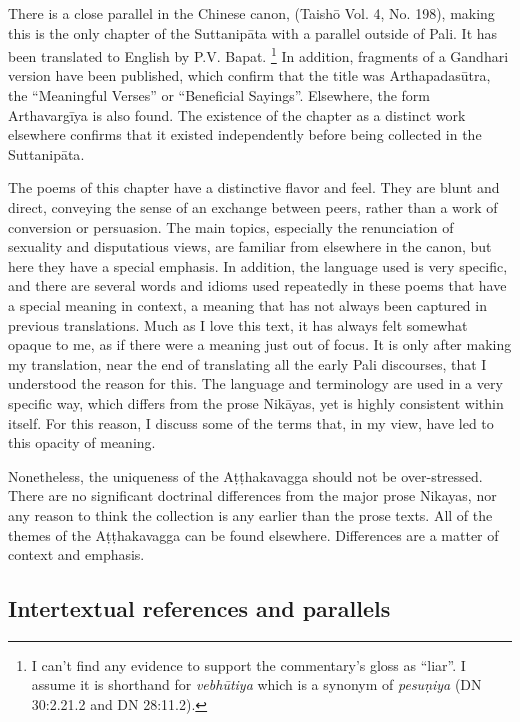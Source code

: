 \documentclass[12pt,openany]{book}%
\newcommand*{\langlzh}[1]{\cjk{#1}\normalfont}%
\begin{document}
There is a close parallel in the Chinese canon, \langlzh{義足經} (Taishō Vol. 4, No. 198), making this is the only chapter of the \textsanskrit{Suttanipāta} with a parallel outside of Pali. It has been translated to English by P.V. Bapat. \footnote{I can’t find any evidence to support the commentary’s gloss as “liar”. I assume it is shorthand for \textit{\textsanskrit{vebhūtiya}} which is a synonym of \textit{\textsanskrit{pesuṇiya}} (DN 30:2.21.2 and DN 28:11.2). } In addition, fragments of a Gandhari version have been published, which confirm that the title was \textsanskrit{Arthapadasūtra}, the “Meaningful Verses” or “Beneficial Sayings”. Elsewhere, the form \textsanskrit{Arthavargīya} is also found. The existence of the chapter as a distinct work elsewhere confirms that it existed independently before being collected in the \textsanskrit{Suttanipāta}.

The poems of this chapter have a distinctive flavor and feel. They are blunt and direct, conveying the sense of an exchange between peers, rather than a work of conversion or persuasion. The main topics, especially the renunciation of sexuality and disputatious views, are familiar from elsewhere in the canon, but here they have a special emphasis. In addition, the language used is very specific, and there are several words and idioms used repeatedly in these poems that have a special meaning in context, a meaning that has not always been captured in previous translations. Much as I love this text, it has always felt somewhat opaque to me, as if there were a meaning just out of focus. It is only after making my translation, near the end of translating all the early Pali discourses, that I understood the reason for this. The language and terminology are used in a very specific way, which differs from the prose \textsanskrit{Nikāyas}, yet is highly consistent within itself. For this reason, I discuss some of the terms that, in my view, have led to this opacity of meaning.

Nonetheless, the uniqueness of the \textsanskrit{Aṭṭhakavagga} should not be over-stressed. There are no significant doctrinal differences from the major prose Nikayas, nor any reason to think the collection is any earlier than the prose texts. All of the themes of the \textsanskrit{Aṭṭhakavagga} can be found elsewhere. Differences are a matter of context and emphasis.

\subsection*{Intertextual references and parallels}
\end{document}
